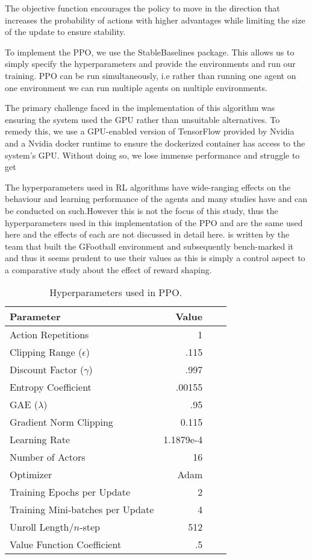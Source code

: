 \documentclass[11pt]{article}
\begin{document}
The objective function encourages the policy to move in the direction that increases the probability of actions with higher advantages while limiting the size of the update to ensure stability.

To implement the PPO, we use the StableBaselines \cite{stable-baselines} package. This allows us to simply specify the hyperparameters and provide the environments and run our training. PPO can be run simultaneously, i.e rather than running one agent on one environment we can run multiple agents on multiple environments.

The primary challenge faced in the implementation of this algorithm was ensuring the system used the GPU rather than unsuitable alternatives. To remedy this, we use a GPU-enabled version of TensorFlow provided by Nvidia and a Nvidia docker runtime to ensure the dockerized container has access to the system's GPU. Without doing so, we lose immense performance and struggle to get 

The hyperparameters used in RL algorithms have wide-ranging effects on the behaviour and learning performance of the agents and many studies have and can be conducted on such.However this is not the focus of this study, thus the hyperparameters used in this implementation of the PPO and are the same used here \cite{Kurach2020} and the effects of each are not discussed in detail here.  is written by the team that built the GFootball environment and subsequently bench-marked it and thus it seems prudent to use their values as this is simply a control aspect to a comparative study about the effect of reward shaping.

\begin{table*}[h!]
\caption{Hyperparameters used in PPO.}
\begin{center}

\begin{tabular}{lrrr}
\toprule
\textbf{Parameter} & \textbf{Value} \\ \midrule
Action Repetitions & 1 \\
Clipping Range ($\epsilon$)  & .115\\
Discount Factor ($\gamma$) &  .997 \\
Entropy Coefficient & .00155\\
GAE ($\lambda$) & .95 \\
Gradient Norm Clipping & 0.115 \\
Learning Rate  & 1.1879e-4 \\
Number of Actors & 16 \\
Optimizer & Adam \\
Training Epochs per Update & 2 \\
Training Mini-batches per Update & 4 \\
Unroll Length/$n$-step & 512 \\
Value Function Coefficient & .5 \\
\bottomrule
\end{tabular}
\label{tab:ppo_hparams_values}
\end{center}
\end{table*}
\end{document}
